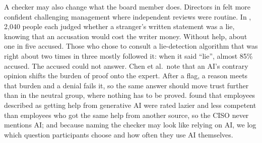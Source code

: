 \documentclass[stu, 12pt]{apa7}
\begin{document}
A checker may also change what the board member does. Directors in \textcite{aamir2026} felt more confident challenging management where independent reviews were routine. In \textcite{vonschenk2024}, 2,040 people each judged whether a stranger's written statement was a lie, knowing that an accusation would cost the writer money. Without help, about one in five accused. Those who chose to consult a lie-detection algorithm that was right about two times in three mostly followed it: when it said \enquote{lie}, almost 85\% accused. The accused could not answer. Chen et al.\ note that an AI's contrary opinion shifts the burden of proof onto the expert. After a flag, a reason meets that burden and a denial fails it, so the same answer should move trust further than in the neutral group, where nothing has to be proved. \textcite{reif2025} found that employees described as getting help from generative AI were rated lazier and less competent than employees who got the same help from another source, so the CISO never mentions AI; and because naming the checker may look like relying on AI, we log which question participants choose and how often they use AI themselves.
\end{document}
